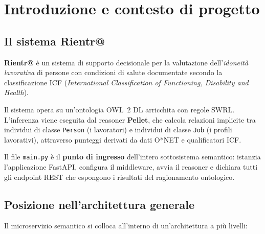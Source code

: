 \documentclass[a4paper,12pt]{article}
\begin{document}
\tableofcontents
\newpage

\listoffigures
{}
\newpage

\listoftables
{}
\newpage

\lstlistoflistings
{}
\newpage

\section{Introduzione e contesto di progetto}

\subsection{Il sistema Rientr@}

\textbf{Rientr@} \`{e} un sistema di supporto decisionale per la valutazione
dell'\textit{idoneit\`{a} lavorativa} di persone con condizioni di salute
documentate secondo la classificazione ICF (\textit{International
Classification of Functioning, Disability and Health}).

Il sistema opera su un'ontologia OWL~2 DL arricchita con regole SWRL.
L'inferenza viene eseguita dal reasoner \textbf{Pellet}, che calcola
relazioni implicite tra individui di classe \texttt{Person} (i lavoratori)
e individui di classe \texttt{Job} (i profili lavorativi), attraverso
punteggi derivati da dati O*NET e qualificatori ICF.

Il file \texttt{main.py} \`{e} il \textbf{punto di ingresso} dell'intero
sottosistema semantico: istanzia l'applicazione FastAPI, configura il
middleware, avvia il reasoner e dichiara tutti gli endpoint REST che
espongono i risultati del ragionamento ontologico.

\subsection{Posizione nell'architettura generale}

Il microservizio semantico si colloca all'interno di un'architettura
a pi\`{u} livelli:
\end{document}
